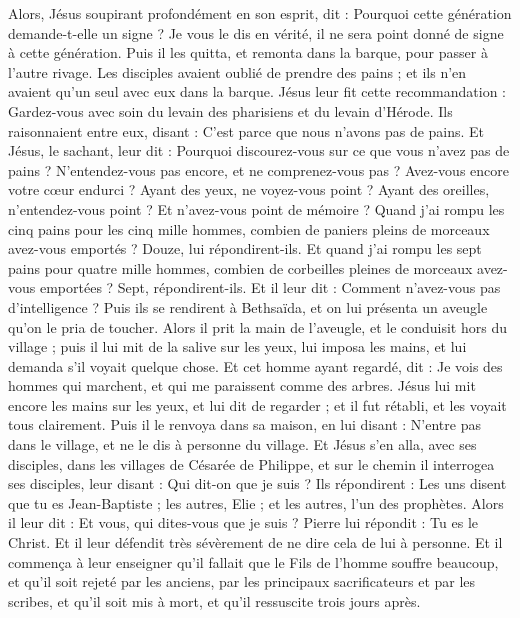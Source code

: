\begin{multicols}{2}
Alors, Jésus soupirant profondément en son esprit, dit : Pourquoi cette génération demande-t-elle un signe ? Je vous le dis en vérité, il ne sera point donné de signe à cette génération.
Puis il les quitta, et remonta dans la barque, pour passer à l'autre rivage.
Les disciples avaient oublié de prendre des pains ; et ils n'en avaient qu'un seul avec eux dans la barque.
Jésus leur fit cette recommandation : Gardez-vous avec soin du levain des pharisiens et du levain d'Hérode.
Ils raisonnaient entre eux, disant : C'est parce que nous n'avons pas de pains.
Et Jésus, le sachant, leur dit : Pourquoi discourez-vous sur ce que vous n'avez pas de pains ? N'entendez-vous pas encore, et ne comprenez-vous pas ?
Avez-vous encore votre cœur endurci ? Ayant des yeux, ne voyez-vous point ? Ayant des oreilles, n'entendez-vous point ? Et n'avez-vous point de mémoire ?
Quand j'ai rompu les cinq pains pour les cinq mille hommes, combien de paniers pleins de morceaux avez-vous emportés ? Douze, lui répondirent-ils.
Et quand j'ai rompu les sept pains pour quatre mille hommes, combien de corbeilles pleines de morceaux avez-vous emportées ? Sept, répondirent-ils.
Et il leur dit : Comment n'avez-vous pas d'intelligence ?
Puis ils se rendirent à Bethsaïda, et on lui présenta un aveugle qu'on le pria de toucher.
Alors il prit la main de l'aveugle, et le conduisit hors du village ; puis il lui mit de la salive sur les yeux, lui imposa les mains, et lui demanda s'il voyait quelque chose.
Et cet homme ayant regardé, dit : Je vois des hommes qui marchent, et qui me paraissent comme des arbres.
Jésus lui mit encore les mains sur les yeux, et lui dit de regarder ; et il fut rétabli, et les voyait tous clairement.
Puis il le renvoya dans sa maison, en lui disant : N'entre pas dans le village, et ne le dis à personne du village.
Et Jésus s'en alla, avec ses disciples, dans les villages de Césarée de Philippe, et sur le chemin il interrogea ses disciples, leur disant : Qui dit-on que je suis ?
Ils répondirent : Les uns disent que tu es Jean-Baptiste ; les autres, Elie ; et les autres, l'un des prophètes.
Alors il leur dit : Et vous, qui dites-vous que je suis ? Pierre lui répondit : Tu es le Christ.
Et il leur défendit très sévèrement de ne dire cela de lui à personne.
Et il commença à leur enseigner qu'il fallait que le Fils de l'homme souffre beaucoup, et qu'il soit rejeté par les anciens, par les principaux sacrificateurs et par les scribes, et qu'il soit mis à mort, et qu'il ressuscite trois jours après.

\end{multicols}
